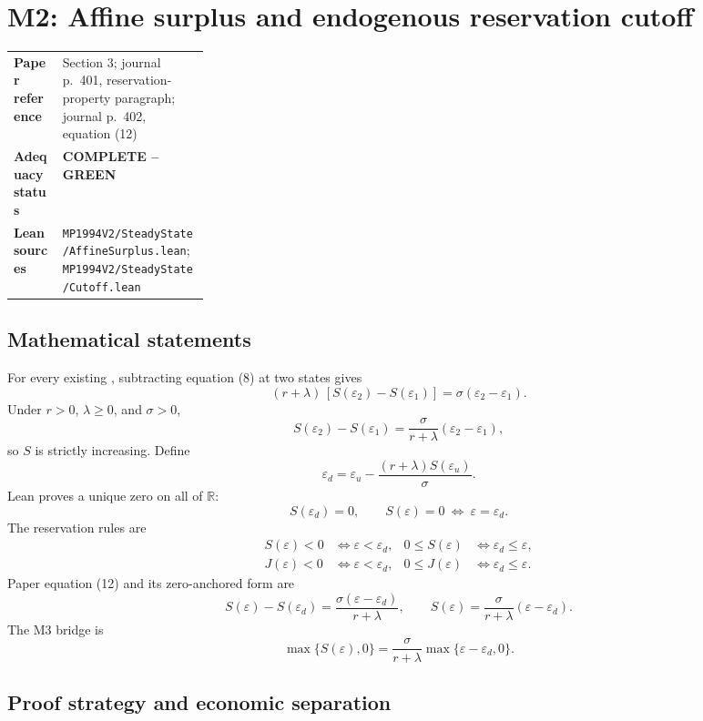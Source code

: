 \documentclass[11pt]{article}
\newcommand{\code}[1]{\texttt{\detokenize{#1}}}
\newcommand{\completeGreen}{\textcolor{green!50!black}{\textbf{COMPLETE -- GREEN}}}
\begin{document}
\section{M2: Affine surplus and endogenous reservation cutoff}

\begin{tabularx}{\linewidth}{@{}>{\bfseries}p{0.25\linewidth}X@{}}
Paper reference & Section 3; journal p.~401, reservation-property paragraph;
journal p.~402, equation (12)\\
Adequacy status & \completeGreen\\
Lean sources & \nolinkurl{MP1994V2/SteadyState/AffineSurplus.lean};
\nolinkurl{MP1994V2/SteadyState/Cutoff.lean}\\
\end{tabularx}

\subsection{Mathematical statements}

For every existing \code{ValueEquilibrium P}, subtracting equation (8) at two
states gives
\[
(r+\lambda)\,[S(\varepsilon_2)-S(\varepsilon_1)]
=\sigma(\varepsilon_2-\varepsilon_1).
\]
Under \(r>0\), \(\lambda\geq0\), and \(\sigma>0\),
\[
S(\varepsilon_2)-S(\varepsilon_1)
=\frac{\sigma}{r+\lambda}(\varepsilon_2-\varepsilon_1),
\]
so \(S\) is strictly increasing. Define
\[
\varepsilon_d
=\varepsilon_u-\frac{(r+\lambda)S(\varepsilon_u)}{\sigma}.
\]
Lean proves a unique zero on all of \(\mathbb R\):
\[
S(\varepsilon_d)=0,\qquad
S(\varepsilon)=0\ \Longleftrightarrow\ \varepsilon=\varepsilon_d.
\]
The reservation rules are
\[
\begin{aligned}
S(\varepsilon)<0&\Longleftrightarrow\varepsilon<\varepsilon_d,&
0\leq S(\varepsilon)&\Longleftrightarrow\varepsilon_d\leq\varepsilon,\\
J(\varepsilon)<0&\Longleftrightarrow\varepsilon<\varepsilon_d,&
0\leq J(\varepsilon)&\Longleftrightarrow\varepsilon_d\leq\varepsilon.
\end{aligned}
\]
Paper equation (12) and its zero-anchored form are
\[
S(\varepsilon)-S(\varepsilon_d)
=\frac{\sigma(\varepsilon-\varepsilon_d)}{r+\lambda},
\qquad
S(\varepsilon)=\frac{\sigma}{r+\lambda}(\varepsilon-\varepsilon_d).
\]
The M3 bridge is
\[
\max\{S(\varepsilon),0\}
=\frac{\sigma}{r+\lambda}\max\{\varepsilon-\varepsilon_d,0\}.
\]

\subsection{Proof strategy and economic separation}
\end{document}
